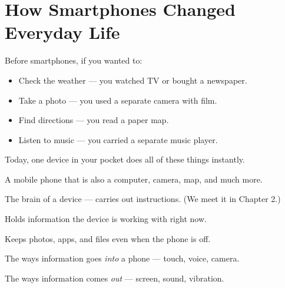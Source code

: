 \sectionrule

\section*{How Smartphones Changed Everyday Life}

Before smartphones, if you wanted to:
\begin{itemize}
  \item Check the weather — you watched TV or bought a newspaper.
  \item Take a photo — you used a separate camera with film.
  \item Find directions — you read a paper map.
  \item Listen to music — you carried a separate music player.
\end{itemize}

Today, one device in your pocket does all of these things instantly.

\begin{diagram}
\end{diagram}

\sectionrule

\begin{newwords}
  \begin{description}[labelwidth=3.5cm, leftmargin=3.7cm]
    \item[\term{Smartphone}]   A mobile phone that is also a computer, camera, map, and much more.
    \item[\term{Processor}]    The brain of a device — carries out instructions. (We meet it in Chapter 2.)
    \item[\term{Memory}]       Holds information the device is working with right now.
    \item[\term{Storage}]      Keeps photos, apps, and files even when the phone is off.
    \item[\term{Input}]        The ways information goes \emph{into} a phone — touch, voice, camera.
    \item[\term{Output}]       The ways information comes \emph{out} — screen, sound, vibration.
  \end{description}
\end{newwords}

